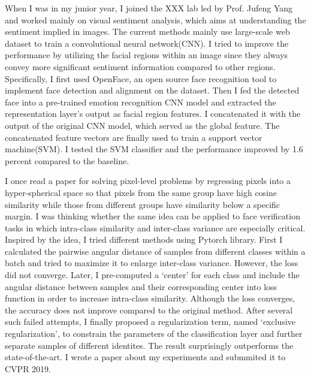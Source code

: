 \documentclass{article}
\begin{document}
\begin{Large}
\par{When I was in my junior year, I joined the XXX lab led by Prof. Jufeng Yang and worked mainly on visual sentiment analysis, which aims at understanding the sentiment implied in images. The current methods mainly use large-scale web dataset to train a convolutional neural network(CNN). I tried to improve the performance by utilizing the facial regions within an image since they always convey more significant sentiment information compared to other regions.  Specifically, I first used OpenFace, an open source face recognition tool to implement face detection and alignment on the dataset. Then I fed the detected face into a pre-trained emotion recognition CNN model and extracted the representation layer’s output as facial region features. I concatenated it with the output of the original CNN model, which served as the global feature. The concatenated feature vectors are finally used to train a support vector machine(SVM). I tested the SVM classifier and the performance improved by 1.6 percent compared to the baseline.}
\par{I once read a paper for solving pixel-level problems by regressing pixels into a hyper-spherical space so that pixels from the same group have high cosine similarity while those from different groups have similarity below a specific margin.  I was thinking whether the same idea can be applied to face verification tasks in which intra-class similarity and inter-class variance are especially critical. Inspired by the idea, I tried different methods using Pytorch library. First I calculated the pairwise angular distance of samples from different classes within a batch and tried to maximize it to enlarge inter-class variance. However, the loss did not converge. Later, I pre-computed a ‘center’ for each class and include the angular distance between samples and their corresponding center into loss function in order to increase intra-class similarity. Although the loss converges, the accuracy does not improve compared to the original method. After several such failed attempts, I finally proposed a regularization term, named ‘exclusive regularization’, to constrain the parameters of the classification layer and further separate samples of different identites. The result surprisingly outperforms the state-of-the-art. I wrote a paper about my experiments and submmited it to CVPR 2019.}

\end{Large}
\end{document}
